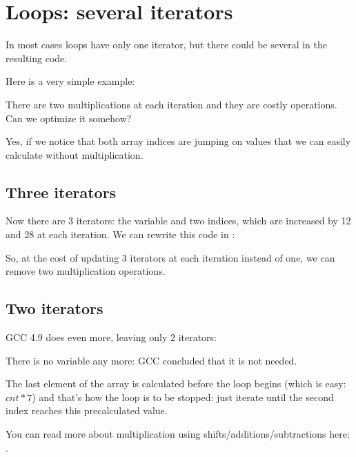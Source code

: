 ﻿\section{Loops: several iterators}
\label{loop_iterators}

In most cases loops have only one iterator, but there could be several in the resulting code.

Here is a very simple example:



There are two multiplications at each iteration and they are costly operations.
Can we optimize it somehow?

Yes, if we notice that both array indices are jumping on values that we can easily calculate without 
multiplication.

\subsection{Three iterators}



Now there are 3 iterators: the  variable and two indices, which are increased by 12 and 28 at 
each iteration.
We can rewrite this code in \CCpp:



So, at the cost of updating 3 iterators at each iteration instead of one, 
we can remove two multiplication operations.

\subsection{Two iterators}

GCC 4.9 does even more, leaving only 2 iterators:



There is no  variable any more: GCC concluded that it is not needed.

The last element of the  array is calculated before the loop begins (which is easy: $cnt*7$) 
and that's how the loop is to be stopped: just iterate until the second index reaches this precalculated value.

You can read more about multiplication using shifts/additions/subtractions here: 
.

